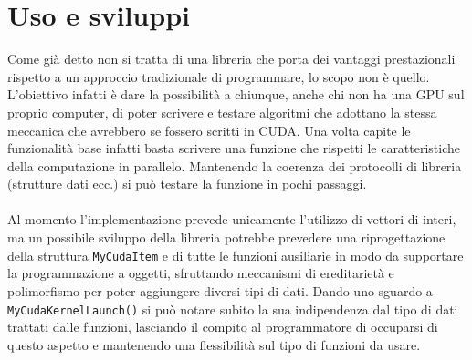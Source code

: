 \documentclass[binding=0.6cm, noexaminfo]{sapthesis}\usepackage{microtype}
\begin{document}
\chapter{Uso e sviluppi}
Come già detto non si tratta di una libreria che porta dei vantaggi prestazionali rispetto a un approccio tradizionale di programmare, lo scopo non è quello. L'obiettivo infatti è dare la possibilità a chiunque, anche chi non ha una GPU sul proprio computer, di poter scrivere e testare algoritmi che adottano la stessa meccanica che avrebbero se fossero scritti in CUDA. Una volta capite le funzionalità base infatti basta scrivere una funzione che rispetti le caratteristiche della computazione in parallelo. Mantenendo la coerenza dei protocolli di libreria (strutture dati ecc.) si può testare la funzione in pochi passaggi. 
\\\\
Al momento l'implementazione prevede unicamente l'utilizzo di vettori di interi, ma un possibile sviluppo della libreria potrebbe prevedere una riprogettazione della struttura \texttt{MyCudaItem} e di tutte le funzioni ausiliarie in modo da supportare la programmazione a oggetti, sfruttando meccanismi di ereditarietà e polimorfismo per poter aggiungere diversi tipi di dati. Dando uno sguardo a \texttt{MyCudaKernelLaunch()} si può notare subito la sua indipendenza dal tipo di dati trattati dalle funzioni, lasciando il compito al programmatore di occuparsi di questo aspetto e mantenendo una flessibilità sul tipo di funzioni da usare.  



\backmatter
\end{document}
